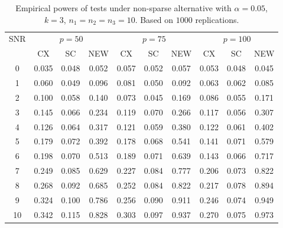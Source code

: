 \documentclass[review]{elsarticle}
\theoremstyle{plain}
\theoremstyle{definition}
\theoremstyle{remark}
\begin{document}
\begin{table}[!hbp]
    \caption{Empirical powers of tests under non-sparse alternative with $\alpha=0.05$, $k=3$, $n_1=n_2=n_3=10$. Based on $1000$ replications.}
    \centering
    \begin{tabular}{*{10}{c}}
    \toprule
    \multirow{2}{*}{SNR} &\multicolumn{3}{c}{$p=50$}&\multicolumn{3}{c}{$p=75$}&\multicolumn{3}{c}{$p=100$} \\
        \cmidrule(r){2-4}\cmidrule(r){5-7}\cmidrule(r){8-10}
        & CX & SC & NEW & CX &SC &NEW &CX & SC & NEW\\
    \midrule
0 & 0.035 & 0.048 & 0.052 & 0.057 & 0.052 & 0.057 & 0.053 & 0.048 & 0.045 \\ 
1 & 0.060 & 0.049 & 0.096 & 0.081 & 0.050 & 0.092 & 0.063 & 0.062 & 0.085 \\ 
2 & 0.100 & 0.058 & 0.140 & 0.073 & 0.045 & 0.169 & 0.086 & 0.055 & 0.171 \\ 
3 & 0.145 & 0.066 & 0.234 & 0.119 & 0.070 & 0.266 & 0.117 & 0.056 & 0.307 \\ 
4 & 0.126 & 0.064 & 0.317 & 0.121 & 0.059 & 0.380 & 0.122 & 0.061 & 0.402 \\ 
5 & 0.179 & 0.072 & 0.392 & 0.178 & 0.068 & 0.541 & 0.141 & 0.071 & 0.579 \\ 
6 & 0.198 & 0.070 & 0.513 & 0.189 & 0.071 & 0.639 & 0.143 & 0.066 & 0.717 \\ 
7 & 0.249 & 0.085 & 0.629 & 0.227 & 0.084 & 0.777 & 0.206 & 0.073 & 0.822 \\ 
8 & 0.268 & 0.092 & 0.685 & 0.252 & 0.084 & 0.822 & 0.217 & 0.078 & 0.894 \\ 
9 & 0.324 & 0.100 & 0.786 & 0.256 & 0.090 & 0.911 & 0.246 & 0.074 & 0.949 \\ 
10 & 0.342 & 0.115 & 0.828 & 0.303 & 0.097 & 0.937 & 0.270 & 0.075 & 0.973 \\ 
\bottomrule
\end{tabular}
\end{table}
\end{document}
